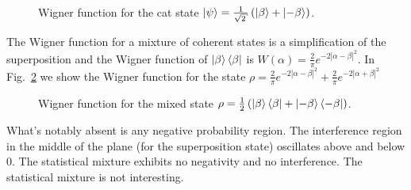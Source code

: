 \begin{homeworkProblem}
\begin{figure}[ht]
    \centering
    
    \caption{Wigner function for the cat state $ \ket{\psi} = \frac{1}{\sqrt{2}}
    \left( \ket{\beta} + \ket{-\beta} \right)$.}
    \label{fig:Problem5b}
\end{figure}

The Wigner function for a mixture of coherent states is a simplification of the
superposition and the Wigner function of $\ket{\beta}\bra{\beta}$
is $ W(\alpha) = \frac{2}{\pi} e^{-2 \left| \alpha - \beta \right|^2} $.
In Fig.~\ref{fig:Problem5b} we show the Wigner function for the state $ \rho =
\frac{2}{\pi} e^{-2 \left| \alpha - \beta \right|^2} + \frac{2}{\pi} e^{-2 \left| \alpha + \beta \right|^2} $
\begin{figure}[ht]
    \centering
    
    \caption{Wigner function for the mixed state $ \rho = \frac{1}{2}
    \left( \ket{\beta}\bra{\beta} + \ket{-\beta}\bra{-\beta} \right)$.}
    \label{fig:Problem5b}
\end{figure}
What's notably absent is any negative probability region. The interference
region in the middle of the plane (for the superposition state) oscillates above
and below 0. The statistical mixture exhibits no negativity and no interference.
The statistical mixture is not interesting.
\end{homeworkProblem}
